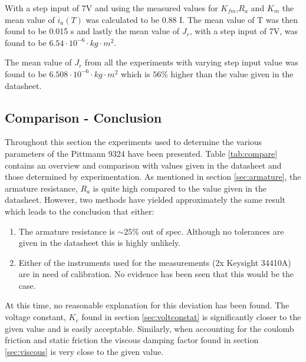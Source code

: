 With a step input of 7V and using the measured values for $K_{fm}$,$R_a$ and $K_m$ the mean value of $i_a(T)$ was calculated to be 0.88 I. 
The mean value of T was then found to be 0.015 s and lastly the mean value of $J_r$, with a step input of 7V, was found to be $6.54 \cdot 10^{-6} \cdot kg \cdot m^2$.

\par
The mean value of $J_r$ from all the experiments with varying step input value was found to be $ 6.508 \cdot 10^{-6} \cdot kg \cdot m^2$ which is $56\%$ higher than the value given in the datasheet. 

\subsection{Comparison - Conclusion}
Throughout this section the experiments used to determine the various parameters of the Pittmann 9324 have been presented.
Table \ref{tab:compare} contains an overview and comparison with values given in the datasheet and those determined by experimentation.
As mentioned in section \ref{sec:armature}, the armature resistance, $R_a$ is quite high compared to the value given in the datasheet.
However, two methods have yielded approximately the same result which leads to the conclusion that either:
\begin{enumerate}
	\item The armature resistance is $\sim25$\% out of spec. 
	Although no tolerances are given in the datasheet this is highly unlikely.
	\item Either of the instruments used for the measurements (2x Keysight 34410A) are in need of calibration. 
	No evidence has been seen that this would be the case.
\end{enumerate}
At this time, no reasonable explanation for this deviation has been found.
The voltage constant, $K_e$ found in section \ref{sec:voltconstat} is significantly closer to the given value and is easily acceptable.
Similarly, when accounting for the coulomb friction and static friction the viscous damping factor found in section \ref{sec:viscous} is very close to the given value.

